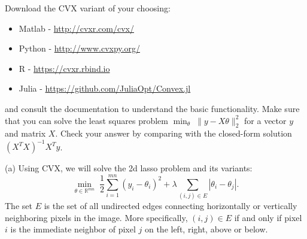 \documentclass{article}
\theoremstyle{remark}
\theoremstyle{definition}
\begin{document}
Download the CVX variant of your choosing:
\begin{itemize}
\item Matlab - \url{http://cvxr.com/cvx/}
\item Python - \url{http://www.cvxpy.org/}
\item R - \url{https://cvxr.rbind.io}
\item Julia - \url{https://github.com/JuliaOpt/Convex.jl}
\end{itemize}
and consult the documentation to understand the basic functionality. Make sure
that you can solve the least squares problem $\min_\theta \;
\|y-X\theta\|_2^2$ for a vector $y$ and matrix $X$. Check your answer
by comparing with the closed-form solution $(X^T X)^{-1} X^T y$.

\bigskip
\noindent
(a) Using CVX, we will solve the 2d lasso problem and its variants:
$$ \min_{\theta\in\mathbb{R}^{mn}} \; \frac{1}{2} \sum_{i=1}^{mn} (y_i- \theta_i)^2 +
\lambda \sum_{(i,j)\in E}\left|\theta_i-\theta_j\right|.$$
The set $E$ is the set of all undirected edges connecting horizontally or
vertically neighboring pixels in the image. More specifically, $(i,j) \in E$
if and only if pixel $i$ is the immediate neighbor of pixel $j$ on the left,
right, above or below. 
\end{document}

